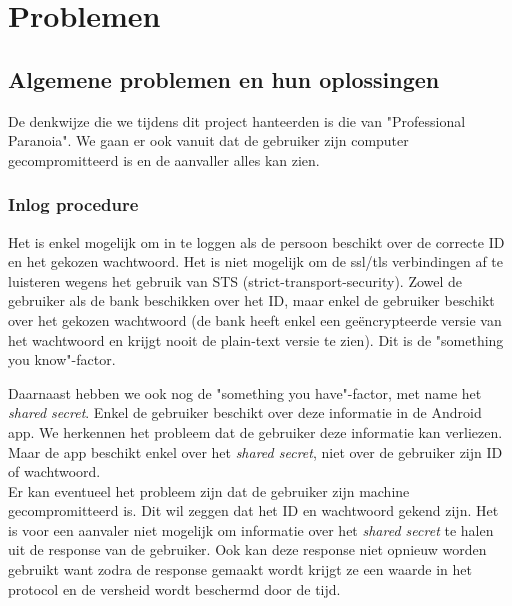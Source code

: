 \documentclass[11pt]{article}
\begin{document}
\section{Problemen}
\subsection{Algemene problemen en hun oplossingen}
De denkwijze die we tijdens dit project hanteerden is die van "Professional Paranoia". We gaan er ook vanuit dat de gebruiker zijn computer gecompromitteerd is en de aanvaller alles kan zien.

\subsubsection{Inlog procedure}
Het is enkel mogelijk om in te loggen als de persoon beschikt over de correcte ID en het gekozen wachtwoord. Het is niet mogelijk om de ssl/tls verbindingen af te luisteren wegens het gebruik van STS (strict-transport-security). Zowel de gebruiker als de bank beschikken over het ID, maar enkel de gebruiker beschikt over het gekozen wachtwoord (de bank heeft enkel een ge\"encrypteerde versie van het wachtwoord en krijgt nooit de plain-text versie te zien). Dit is de "something you know"-factor.

Daarnaast hebben we ook nog de "something you have"-factor, met name het \emph{shared secret}. Enkel de gebruiker beschikt over deze informatie in de Android app. We herkennen het probleem dat de gebruiker deze informatie kan verliezen. Maar de app beschikt enkel over het \emph{shared secret}, niet over de gebruiker zijn ID of wachtwoord.\\

Er kan eventueel het probleem zijn dat de gebruiker zijn machine gecompromitteerd is. Dit wil zeggen dat het ID en wachtwoord gekend zijn. Het is voor een aanvaler niet mogelijk om informatie over het \emph{shared secret} te halen uit de response van de gebruiker. Ook kan deze response niet opnieuw worden gebruikt want zodra de response gemaakt wordt krijgt ze een waarde in het protocol en de versheid wordt beschermd door de tijd.
\end{document}
